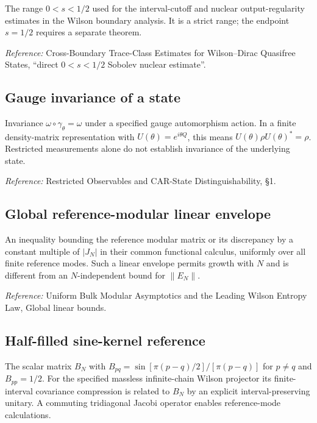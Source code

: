 \documentclass[
  10pt,
  a4paper,
]{article}
\begin{document}
The range \(0<s<1/2\) used for the interval-cutoff and nuclear output-regularity estimates in the Wilson boundary analysis. It is a strict range; the endpoint \(s=1/2\) requires a separate theorem.

\nopagebreak[4]

\emph{Reference:} Cross-Boundary Trace-Class Estimates for Wilson--Dirac Quasifree States, ``direct \(0<s<1/2\) Sobolev nuclear estimate''.

\subsection{Gauge invariance of a state}\label{gauge-invariance-of-a-state}

Invariance \(\omega\circ\gamma_\theta=\omega\) under a specified gauge automorphism action. In a finite density-matrix representation with \(U(\theta)=e^{i\theta Q}\), this means \(U(\theta)\rho U(\theta)^*=\rho\). Restricted measurements alone do not establish invariance of the underlying state.

\nopagebreak[4]

\emph{Reference:} Restricted Observables and CAR-State Distinguishability, §1.

\subsection{Global reference-modular linear envelope}\label{global-reference-modular-linear-envelope}

An inequality bounding the reference modular matrix or its discrepancy by a constant multiple of \(|J_N|\) in their common functional calculus, uniformly over all finite reference modes. Such a linear envelope permits growth with \(N\) and is different from an \(N\)-independent bound for \(\|E_N\|\).

\nopagebreak[4]

\emph{Reference:} Uniform Bulk Modular Asymptotics and the Leading Wilson Entropy Law, Global linear bounds.

\subsection{Half-filled sine-kernel reference}\label{half-filled-sine-kernel-reference}

The scalar matrix \(B_N\) with \(B_{pq}=\sin[\pi(p-q)/2]/[\pi(p-q)]\) for \(p\ne q\) and \(B_{pp}=1/2\). For the specified massless infinite-chain Wilson projector its finite-interval covariance compression is related to \(B_N\) by an explicit interval-preserving unitary. A commuting tridiagonal Jacobi operator enables reference-mode calculations.
\end{document}

